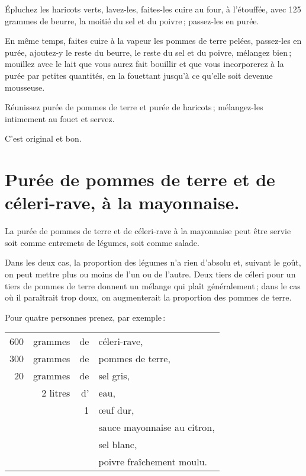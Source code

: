 Épluchez les haricots verts, lavez-les, faites-les cuire au four, à l'étouffée,
avec 125 grammes de beurre, la moitié du sel et du poivre ; passez-les en purée.

En même temps, faites cuire à la vapeur les pommes de terre pelées, passez-les
en purée, ajoutez-y le reste du beurre, le reste du sel et du poivre, mélangez
bien ; mouillez avec le lait que vous aurez fait bouillir et que vous
incorporerez à la purée par petites quantités, en la fouettant jusqu'à ce
qu'elle soit devenue mousseuse.

Réunissez purée de pommes de terre et purée de haricots ; mélangez-les
intimement au fouet et servez.

C'est original et bon.

\section*{\centering Purée de pommes de terre et de céleri-rave, à la mayonnaise.}
{}

La purée de pommes de terre et de céleri-rave à la mayonnaise peut être servie
soit comme entremets de légumes, soit comme salade.

Dans les deux cas, la proportion des légumes n'a rien d'absolu et, suivant le
goût, on peut mettre plus ou moins de l'un ou de l'autre. Deux tiers de céleri
pour un tiers de pommes de terre donnent un mélange qui plaît généralement ;
dans le cas où il paraîtrait trop doux, on augmenterait la proportion des
pommes de terre.

\medskip

Pour quatre personnes prenez, par exemple :

\footnotesize
\begin{longtable}{rrrp{16em}}
    600 & grammes  & de & céleri-rave,                                                                    \\
    300 & grammes  & de & pommes de terre,                                                                \\
     20 & grammes  & de & sel gris,                                                                       \\
        & 2 litres & d' & eau,                                                                            \\
        &          &  1 & œuf dur,                                                                        \\
        &          &    & sauce mayonnaise au citron,                                                     \\
        &          &    & sel blanc,                                                                      \\
        &          &    & poivre fraîchement moulu.                                                       \\
\end{longtable}
\normalsize

